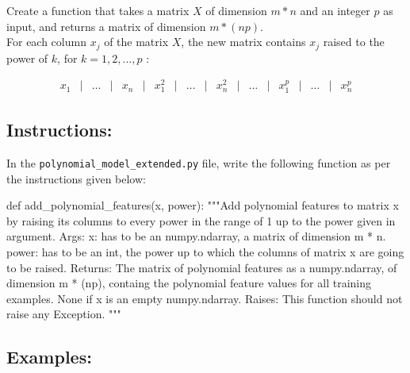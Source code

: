 \documentclass[]{article}
\newenvironment{Shaded}{\begin{snugshade}}{\end{snugshade}}
\newcommand{\CommentTok}[1]{\textcolor[rgb]{0.48,0.49,0.49}{#1}}
\newcommand{\KeywordTok}[1]{\textcolor[rgb]{0.81,0.81,0.76}{#1}}
\newcommand{\NormalTok}[1]{\textcolor[rgb]{0.81,0.81,0.76}{#1}}
\begin{document}
Create a function that takes a matrix \(X\) of dimension \(m * n\) and
an integer \(p\) as input, and returns a matrix of dimension
\(m * (np)\).\\
For each column \(x_j\) of the matrix \(X\), the new matrix contains
\(x_j\) raised to the power of \(k\), for \(k = 1, 2, ..., p\) :

\large

\[
\begin{matrix}
x_1 &|& \dots &|& x_n &|& x_1^2 &|& \dots &|& x_n^2 &|& \dots &|& x_1^p &|& \dots &|& x_n^p
\end{matrix}
\] \normalsize

\hypertarget{instructions-2}{%
\subsection{Instructions:}\label{instructions-2}}

In the \texttt{polynomial\_model\_extended.py} file, write the following
function as per the instructions given below:

\begin{Shaded}
\begin{Highlighting}[]
\KeywordTok{def}\NormalTok{ add_polynomial_features(x, power):}
    \CommentTok{"""Add polynomial features to matrix x by raising its columns to every power in the range of 1 up to the power given in argument.  }
\CommentTok{    Args:}
\CommentTok{      x: has to be an numpy.ndarray, a matrix of dimension m * n.}
\CommentTok{      power: has to be an int, the power up to which the columns of matrix x are going to be raised.}
\CommentTok{    Returns:}
\CommentTok{      The matrix of polynomial features as a numpy.ndarray, of dimension m * (np), containg the polynomial feature values for all training examples.}
\CommentTok{      None if x is an empty numpy.ndarray.}
\CommentTok{    Raises:}
\CommentTok{      This function should not raise any Exception.}
\CommentTok{    """}
\end{Highlighting}
\end{Shaded}

\hypertarget{examples-2}{%
\subsection{Examples:}\label{examples-2}}
\end{document}

